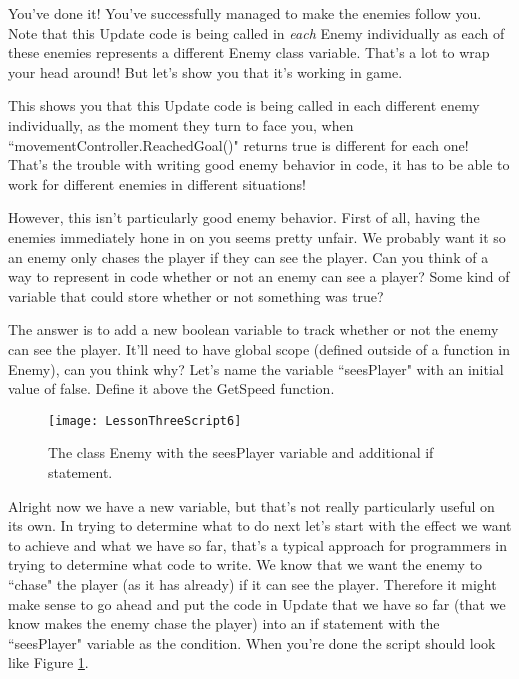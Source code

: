 \documentclass{article}
\begin{document}
You've done it! You've successfully managed to make the enemies follow you. Note that this Update code is being called in \textit{each} Enemy individually as each of these enemies represents a different Enemy class variable. That's a lot to wrap your head around! But let's show you that it's working in game.

\noindent{}

This shows you that this Update code is being called in each different enemy individually, as the moment they turn to face you, when ``movementController.ReachedGoal()" returns true is different for each one! That's the trouble with writing good enemy behavior in code, it has to be able to work for different enemies in different situations! 

However, this isn't particularly good enemy behavior. First of all, having the enemies immediately hone in on you seems pretty unfair. We probably want it so an enemy only chases the player if they can see the player. Can you think of a way to represent in code whether or not an enemy can see a player? Some kind of variable that could store whether or not something was true?

The answer is to add a new boolean variable to track whether or not the enemy can see the player. It'll need to have global scope (defined outside of a function in Enemy), can you think why? Let's name the variable ``seesPlayer" with an initial value of false. Define it above the GetSpeed function. 

\begin{figure}
  \texttt{[image: LessonThreeScript6]}
  \caption{The class Enemy with the seesPlayer variable and additional if statement.}
  \label{fig:LessonThreeScript6}
\end{figure}

Alright now we have a new variable, but that's not really particularly useful on its own. In trying to determine what to do next let's start with the effect we want to achieve and what we have so far, that's a typical approach for programmers in trying to determine what code to write. We know that we want the enemy to ``chase" the player (as it has already) if it can see the player. Therefore it might make sense to go ahead and put the code in Update that we have so far (that we know makes the enemy chase the player) into an if statement with the ``seesPlayer" variable as the condition. When you're done the script should look like Figure \ref{fig:LessonThreeScript6}.
\end{document}

